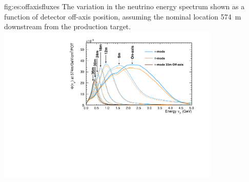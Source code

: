 \begin{dunefigure}{fig:es:offaxisfluxes}
{The variation in the neutrino energy spectrum shown as a function of detector off-axis position, assuming the nominal  location 574~m downstream from the production target.}
\includegraphics[width=0.8\textwidth]{graphics/offaxisfluxes.pdf}
\end{dunefigure}
